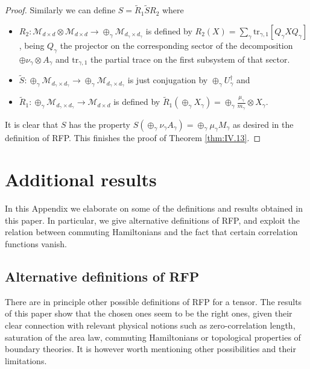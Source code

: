 \documentclass{elsarticle}
\newcommand{\tr}{\mathrm{tr}}
\begin{document}
\begin{proof}
    Similarly we can define $S=\tilde{R}_1\tilde{S} R_2$ where
    \begin{itemize}
        \item $R_2:\mathcal{M}_{d\times d}\otimes \mathcal{M}_{d\times d} \longrightarrow \oplus_\gamma\mathcal{M}_{d_\gamma\times d_\gamma}$
              is defined by  $R_2(X)=\sum_\gamma \tr_{\gamma,1}[Q_\gamma X Q_\gamma]$, being $Q_\gamma$ the projector on the corresponding sector of the decomposition $\oplus \nu_\gamma\otimes A_\gamma$ and $\tr_{\gamma,1}$ the partial trace on the first subsystem of that sector.
        \item $\tilde{S}:\oplus_\gamma\mathcal{M}_{d_\gamma\times d_\gamma}\longrightarrow \oplus_\gamma\mathcal{M}_{d_\gamma\times d_\gamma}$ is just conjugation by $\oplus_\gamma U_\gamma^\dagger$ and
        \item $\tilde{R}_1: \oplus_\gamma\mathcal{M}_{d_\gamma\times d_\gamma}\longrightarrow \mathcal{M}_{d\times d}$ is defined
              by
              $\tilde{R}_1(\oplus_\gamma X_\gamma)= \oplus_\gamma \frac{\mu_\gamma}{m_\gamma} \otimes X_\gamma$.
    \end{itemize}
    It is clear that $S$ has the property  $S(\oplus_\gamma \nu_\gamma A_\gamma)=\oplus_\gamma \mu_\gamma M_\gamma$ as desired in the definition of RFP.
    This finishes the proof of Theorem \ref{thm:IV.13}.

\end{proof}

\section{Additional results}\label{AppendixLooseEnds}

In this Appendix we elaborate on some of the definitions and results obtained in this paper. In particular, we give alternative definitions of RFP, and exploit the relation between commuting Hamiltonians and the fact that certain correlation functions vanish.

\subsection{Alternative definitions of RFP}

There are in principle other possible definitions of RFP for a tensor. The results of this paper show that the chosen ones seem to be the right ones, given their clear connection with relevant physical notions such as zero-correlation length, saturation of the area law, commuting Hamiltonians or topological properties of boundary theories. It is however worth mentioning other possibilities and their limitations.
\end{document}
